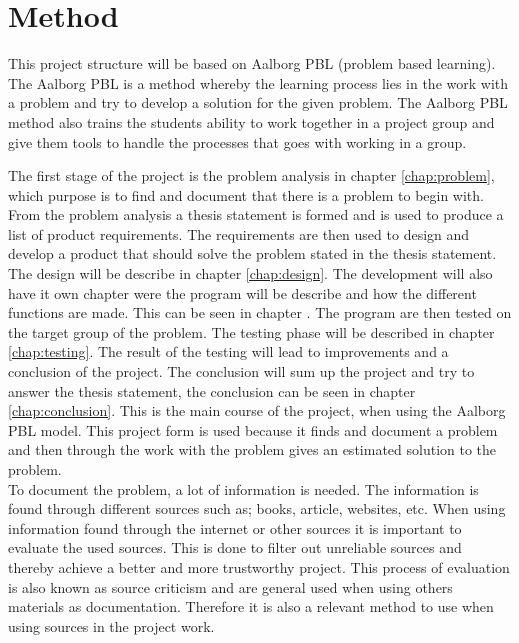 \section{Method}
This project structure will be based on Aalborg PBL (problem based learning). The Aalborg PBL is a method whereby the learning process lies in the work with a problem and try to develop a solution for the given problem.
The Aalborg PBL method also trains the students ability to work together in a project group and give them tools to handle the processes that goes with working in a group.

The first stage of the project is the problem analysis in chapter \ref{chap:problem}, which purpose is to find and document that there is a problem to begin with. From the problem analysis a thesis statement is formed and is used to produce a list of product requirements.
The requirements are then used to design and develop a product that should solve the problem stated in the thesis statement. The design will be describe in chapter \ref{chap:design}.
The development will also have it own chapter were the program will be describe and how the different functions are made. This can be seen in chapter \label{chap:development}.
The program are then tested on the target group of the problem. The testing phase will be described in chapter \ref{chap:testing}. The result of the testing will lead to improvements and a conclusion of the project. The conclusion will sum up the project and try to answer the thesis statement, the conclusion can be seen in chapter \ref{chap:conclusion}. This is the main course of the project, when using the Aalborg PBL model.
This project form is used because it finds and document a problem and then through the work with the problem gives an estimated solution to the problem.\\

To document the problem, a lot of information is needed. The information is found through different sources such as; books, article, websites, etc. When using information found through the internet or other sources it is important to evaluate the used sources.
This is done to filter out unreliable sources and thereby achieve a better and more trustworthy project.
This process of evaluation is also known as source criticism and are general used when using others materials as documentation. Therefore it is also a relevant method to use when using sources in the project work.\\